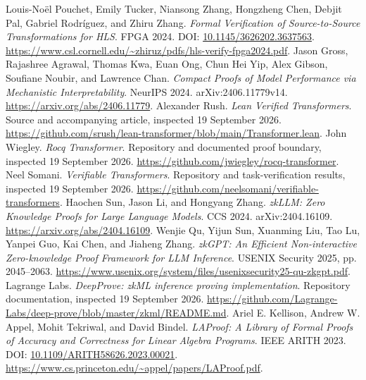  Louis-No\"el Pouchet, Emily Tucker, Niansong Zhang, Hongzheng Chen, Debjit Pal, Gabriel Rodr\'iguez, and Zhiru Zhang.  \emph{Formal Verification of Source-to-Source Transformations for HLS}.  FPGA 2024.  DOI: \href{https://doi.org/10.1145/3626202.3637563}{10.1145/3626202.3637563}.  \url{https://www.csl.cornell.edu/~zhiruz/pdfs/hls-verify-fpga2024.pdf}.
 Jason Gross, Rajashree Agrawal, Thomas Kwa, Euan Ong, Chun Hei Yip, Alex Gibson, Soufiane Noubir, and Lawrence Chan.  \emph{Compact Proofs of Model Performance via Mechanistic Interpretability}.  NeurIPS 2024.  arXiv:2406.11779v14.  \url{https://arxiv.org/abs/2406.11779}.
 Alexander Rush.  \emph{Lean Verified Transformers}.  Source and accompanying article, inspected 19 September 2026.  \url{https://github.com/srush/lean-transformer/blob/main/Transformer.lean}.
 John Wiegley.  \emph{Rocq Transformer}.  Repository and documented proof boundary, inspected 19 September 2026.  \url{https://github.com/jwiegley/rocq-transformer}.
 Neel Somani.  \emph{Verifiable Transformers}.  Repository and task-verification results, inspected 19 September 2026.  \url{https://github.com/neelsomani/verifiable-transformers}.
 Haochen Sun, Jason Li, and Hongyang Zhang.  \emph{zkLLM: Zero Knowledge Proofs for Large Language Models}.  CCS 2024.  arXiv:2404.16109.  \url{https://arxiv.org/abs/2404.16109}.
 Wenjie Qu, Yijun Sun, Xuanming Liu, Tao Lu, Yanpei Guo, Kai Chen, and Jiaheng Zhang.  \emph{zkGPT: An Efficient Non-interactive Zero-knowledge Proof Framework for LLM Inference}.  USENIX Security 2025, pp. 2045--2063.  \url{https://www.usenix.org/system/files/usenixsecurity25-qu-zkgpt.pdf}.
 Lagrange Labs.  \emph{DeepProve: zkML inference proving implementation}.  Repository documentation, inspected 19 September 2026.  \url{https://github.com/Lagrange-Labs/deep-prove/blob/master/zkml/README.md}.
 Ariel E. Kellison, Andrew W. Appel, Mohit Tekriwal, and David Bindel.  \emph{LAProof: A Library of Formal Proofs of Accuracy and Correctness for Linear Algebra Programs}.  IEEE ARITH 2023.  DOI: \href{https://doi.org/10.1109/ARITH58626.2023.00021}{10.1109/ARITH58626.2023.00021}.  \url{https://www.cs.princeton.edu/~appel/papers/LAProof.pdf}.
